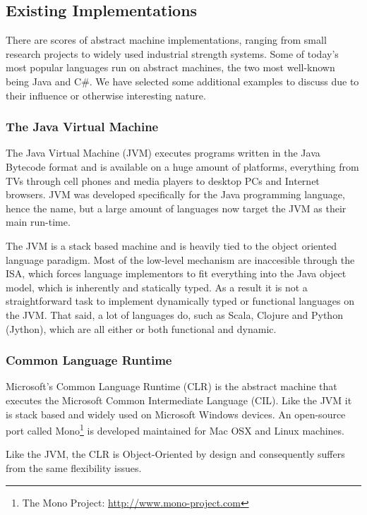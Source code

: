 \subsection{Existing Implementations}

There are scores of abstract machine implementations, ranging from small
research projects to widely used industrial strength systems. Some of today's
most popular languages run on abstract machines, the two most well-known being
Java and C\#\cite{langpop}. We have selected some additional examples to discuss
due to their influence or otherwise interesting nature.

\subsubsection{The Java Virtual Machine}

The Java Virtual Machine (JVM) executes programs written in the Java Bytecode
format and is available on a huge amount of platforms, everything from TVs
through cell phones and media players to desktop PCs and Internet
browsers\cite{aboutjava}. JVM was developed specifically for the Java
programming language, hence the name, but a large amount of languages now target
the JVM as their main run-time.

The JVM is a stack based machine and is heavily tied to the object oriented
language paradigm. Most of the low-level mechanism are inaccesible through the
ISA, which forces language implementors to fit everything into the Java object
model, which is inherently  and statically typed. As a
result it is not a straightforward task to implement dynamically typed or
functional languages on the JVM. That said, a lot of languages do, such as
Scala, Clojure and Python (Jython), which are all either or both functional and
dynamic.

\subsubsection{Common Language Runtime}

Microsoft's Common Language Runtime (CLR) is the abstract machine that executes
the Microsoft Common Intermediate Language (CIL). Like the JVM it is stack based
and widely used on Microsoft Windows devices. An open-source port called
Mono\footnote{The Mono Project: \url{http://www.mono-project.com}} is developed
maintained for Mac OSX and Linux machines.

Like the JVM, the CLR is Object-Oriented by design and consequently suffers from
the same flexibility issues.

